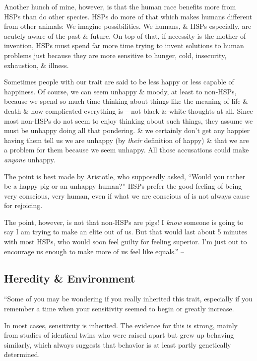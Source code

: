 \documentclass{article}
\numberwithin{equation}{section}
\begin{document}
Another hunch of mine, however, is that the human race benefits more from HSPs than do other species. HSPs do more of that which makes humans different from other animals: We imagine possibilities. We humans, \& HSPs especially, are acutely aware of the past \& future. On top of that, if necessity is the mother of invention, HSPs must spend far more time trying to invent solutions to human problems just because they are more sensitive to hunger, cold, insecurity, exhaustion, \& illness.

Sometimes people with our trait are said to be less happy or less capable of happiness. Of course, we can seem unhappy \& moody, at least to non-HSPs, because we spend so much time thinking about things like the meaning of life \& death \& how complicated everything is -- not black-\&-white thoughts at all. Since most non-HSPs do not seem to enjoy thinking about such things, they assume we must be unhappy doing all that pondering. \& we certainly don't get any happier having them tell us we are unhappy (by \textit{their} definition of happy) \& that we are a problem for them because we seem unhappy. All those accusations could make \textit{anyone} unhappy.

The point is best made by Aristotle, who supposedly asked, ``Would you rather be a happy pig or an unhappy human?'' HSPs prefer the good feeling of being very conscious, very human, even if what we are conscious of is not always cause for rejoicing.

The point, however, is not that non-HSPs are pigs! I \textit{know} someone is going to say I am trying to make an elite out of us. But that would last about 5 minutes with most HSPs, who would soon feel guilty for feeling superior. I'm just out to encourage us enough to make more of us feel like equals.'' -- \cite[pp. 45--46]{Aron2013}

\subsection{Heredity \& Environment}
``Some of you may be wondering if you really inherited this trait, especially if you remember a time when your sensitivity seemed to begin or greatly increase.

In most cases, sensitivity is inherited. The evidence for this is strong, mainly from studies of identical twins who were raised apart but grew up behaving similarly, which always suggests that behavior is at least partly genetically determined.
\end{document}

